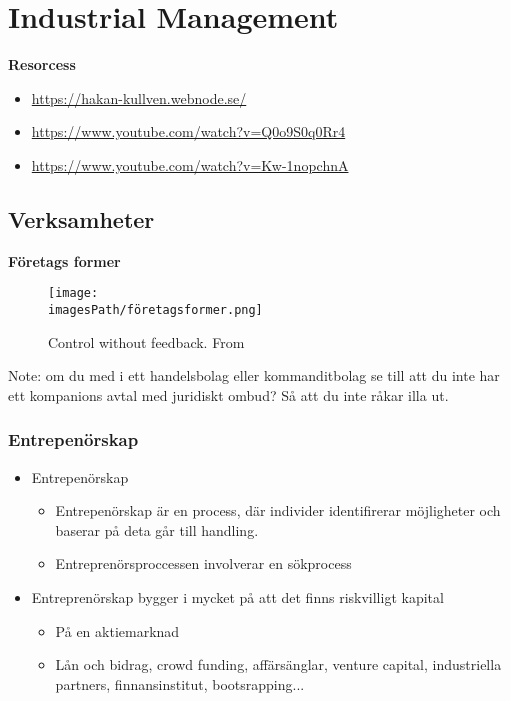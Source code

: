 \chapter{Industrial Management}

\textbf{Resorcess}
\begin{itemize}
    \item \url{https://hakan-kullven.webnode.se/}
    \item \url{https://www.youtube.com/watch?v=Q0o9S0q0Rr4}
    \item \url{https://www.youtube.com/watch?v=Kw-1nopchnA}
\end{itemize}

\newpage

\section{Verksamheter}
\textbf{Företags former}
\begin{figure}[!ht]
    \centering
    \texttt{[image: \\imagesPath/företagsformer.png]}
    \caption{Control without feedback. From \cite{}}
\end{figure}


Note: om du med i ett handelsbolag eller kommanditbolag se till att du inte
har ett kompanions avtal med juridiskt ombud? Så att du inte råkar illa ut.

\subsection{Entrepenörskap}
\begin{itemize}
    \item Entrepenörskap
    \begin{itemize}
        \item Entrepenörskap är en process, där individer identifirerar möjligheter och baserar på deta går till handling.
        \item Entreprenörsproccessen involverar en sökprocess
    \end{itemize}
    \item Entreprenörskap bygger i mycket på att det finns riskvilligt kapital
    \begin{itemize}
        \item På en aktiemarknad 
        \item Lån och bidrag, crowd funding, affärsänglar, venture capital, industriella partners, finnansinstitut, bootsrapping...
    \end{itemize}
\end{itemize}

